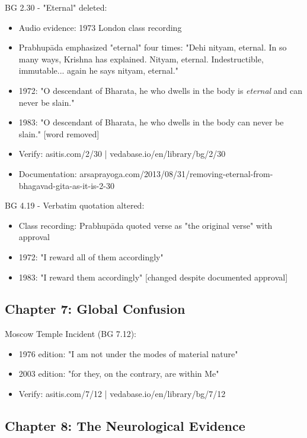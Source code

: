 \documentclass[12pt]{article}
\begin{document}
BG 2.30 - "Eternal" deleted:
\begin{itemize}
\item Audio evidence: 1973 London class recording
\item Prabhupāda emphasized "eternal" four times: "Dehi nityam, eternal. In so many ways, Krishna has explained. Nityam, eternal. Indestructible, immutable... again he says nityam, eternal."
\item 1972: "O descendant of Bharata, he who dwells in the body is \textit{eternal} and can never be slain."
\item 1983: "O descendant of Bharata, he who dwells in the body can never be slain." [word removed]
\item Verify: asitis.com/2/30 | vedabase.io/en/library/bg/2/30
\item Documentation: arsaprayoga.com/2013/08/31/removing-eternal-from-bhagavad-gita-as-it-is-2-30
\end{itemize}

BG 4.19 - Verbatim quotation altered:
\begin{itemize}
\item Class recording: Prabhupāda quoted verse as "the original verse" with approval
\item 1972: "I reward all of them accordingly"
\item 1983: "I reward them accordingly" [changed despite documented approval]
\end{itemize}

\vspace{0.5cm}

\subsection*{Chapter 7: Global Confusion}

Moscow Temple Incident (BG 7.12):
\begin{itemize}
\item 1976 edition: "I am not under the modes of material nature"
\item 2003 edition: "for they, on the contrary, are within Me"
\item Verify: asitis.com/7/12 | vedabase.io/en/library/bg/7/12
\end{itemize}

\vspace{0.5cm}

\subsection*{Chapter 8: The Neurological Evidence}
\end{document}
